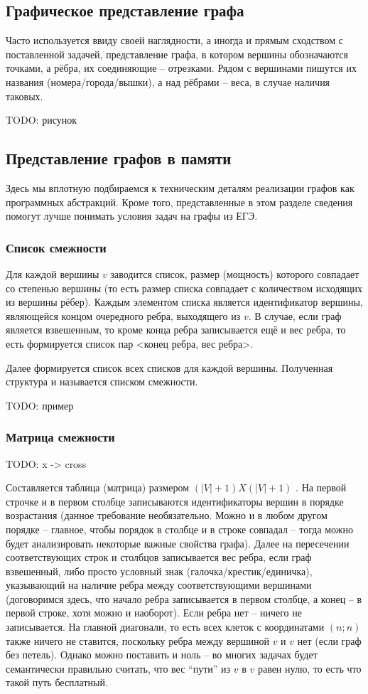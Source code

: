 \subsection{Графическое представление графа}

Часто используется ввиду своей наглядности, а иногда и прямым сходством с поставленной задачей, представление графа, в котором вершины обозначаются точками, а рёбра, их соединяющие -- отрезками. Рядом с вершинами пишутся их названия (номера/города/вышки), а над рёбрами -- веса, в случае наличия таковых. 

TODO: рисунок

\subsection{Представление графов в памяти}

Здесь мы вплотную подбираемся к техническим деталям реализации графов как программных абстракций. Кроме того, представленные в этом разделе сведения помогут лучше понимать условия задач на графы из ЕГЭ.

\subsubsection{Список смежности}
Для каждой вершины $v$ заводится список, размер (мощность) которого совпадает со степенью вершины (то есть размер списка совпадает с количеством исходящих из вершины рёбер). Каждым элементом списка является идентификатор вершины, являющейся концом очередного ребра, выходящего из $v$. В случае, если граф является взвешенным, то кроме конца ребра записывается ещё и вес ребра, то есть формируется список пар <конец ребра, вес ребра>.

Далее формируется список всех списков для каждой вершины. Полученная структура и называется списком смежности.

TODO: пример

\subsubsection{Матрица смежности}

TODO: x -> cross

Составляется таблица (матрица) размером $(|V| + 1) X (|V| + 1)$ .
На первой строчке и в первом  столбце записываются идентификаторы вершин в порядке возрастания (данное требование необязательно. Можно и в любом другом порядке -- главное, чтобы порядок в столбце и в строке совпадал -- тогда можно будет анализировать некоторые важные свойства графа). Далее на пересечении соответствующих строк и столбцов записывается вес ребра, если граф взвешенный, либо просто условный знак (галочка/крестик/единичка), указывающий на наличие ребра между соответствующими вершинами (договоримся здесь, что начало ребра записывается в первом столбце, а конец -- в первой строке, хотя можно и наоборот). Если ребра нет -- ничего не записывается. На главной диагонали, то есть всех клеток с координатами $(n;n)$ также ничего не ставится, поскольку ребра между вершиной $v$ и $v$ нет (если граф без петель). Однако можно поставить и ноль -- во многих задачах будет семантически правильно считать, что вес ``пути'' из $v$ в $v$ равен нулю, то есть что такой путь бесплатный.


